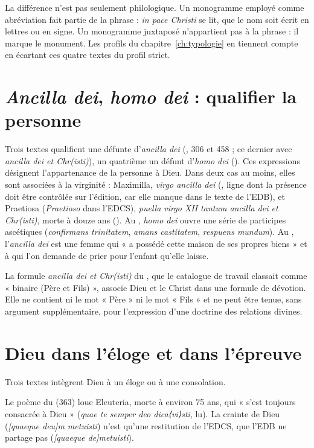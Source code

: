 La différence n’est pas seulement philologique. Un monogramme employé comme abréviation fait partie de la phrase : \emph{in pace Christi} se lit, que le nom soit écrit en lettres ou en signe. Un monogramme juxtaposé n’appartient pas à la phrase : il marque le monument. Les profils du chapitre~\ref{ch:typologie} en tiennent compte en écartant ces quatre textes du profil strict.

\section{\emph{Ancilla dei}, \emph{homo dei} : qualifier la personne}

Trois textes qualifient une défunte d’\emph{ancilla dei} (, 306 et 458 ; ce dernier avec \emph{ancilla dei et Chr(isti)}), un quatrième un défunt d’\emph{homo dei} (). Ces expressions désignent l’appartenance de la personne à Dieu. Dans deux cas au moins, elles sont associées à la virginité : Maximilla, \emph{virgo ancilla dei} (, ligne dont la présence doit être contrôlée sur l’édition, car elle manque dans le texte de l’EDB), et Praetiosa (\emph{Praetioso} dans l’EDCS), \emph{puella virgo XII tantum ancilla dei et Chr(isti)}, morte à douze ans (). Au , \emph{homo dei} ouvre une série de participes ascétiques (\emph{confirmans trinitatem}, \emph{amans castitatem}, \emph{respuens mundum}). Au , l’\emph{ancilla dei} est une femme qui « a possédé cette maison de ses propres biens » et à qui l’on demande de prier pour l’enfant qu’elle laisse.

La formule \emph{ancilla dei et Chr(isti)} du , que le catalogue de travail classait comme « binaire (Père et Fils) », associe Dieu et le Christ dans une formule de dévotion. Elle ne contient ni le mot « Père » ni le mot « Fils » et ne peut être tenue, sans argument supplémentaire, pour l’expression d’une doctrine des relations divines.

\section{Dieu dans l’éloge et dans l’épreuve}

Trois textes intègrent Dieu à un éloge ou à une consolation.

Le poème du  (363) loue Eleuteria, morte à environ 75 ans, qui « s’est toujours consacrée à Dieu » (\emph{quae te semper deo dica⟨vi⟩sti}, lu). La crainte de Dieu (\emph{[quaeque deu]m metuisti}) n’est qu’une restitution de l’EDCS, que l’EDB ne partage pas (\emph{[quaeque de]metuisti}).

